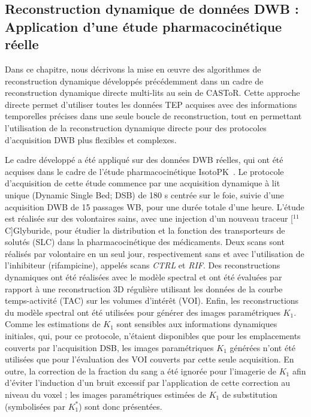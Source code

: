 \subsection*{Reconstruction dynamique de données DWB : Application d'une étude pharmacocinétique réelle}
Dans ce chapitre, nous décrivons la mise en œuvre des algorithmes de reconstruction dynamique développés précédemment dans un cadre de reconstruction dynamique directe multi-lits au sein de CASToR. Cette approche directe permet d'utiliser toutes les données TEP acquises avec des informations temporelles précises dans une seule boucle de reconstruction, tout en permettant l'utilisation de la reconstruction dynamique directe pour des protocoles d'acquisition DWB plus flexibles et complexes.

Le cadre développé a été appliqué sur des données DWB réelles, qui ont été acquises dans le cadre de l'étude pharmacocinétique IsotoPK~\cite{Marie2019}. 
Le protocole d'acquisition de cette étude commence par une acquisition dynamique à lit unique (Dynamic Single Bed; DSB) de 180 s centrée sur le foie, suivie d'une acquisition DWB de 15 passages WB, pour une durée totale d'une heure. L'étude est réalisée sur des volontaires sains, avec une injection d'un nouveau traceur [$^{11}$C]Glyburide, pour étudier la distribution et la fonction des transporteurs de solutés (SLC) dans la pharmacocinétique des médicaments. Deux scans sont réalisés par volontaire en un seul jour, respectivement sans et avec l'utilisation de l'inhibiteur (rifampicine), appelés scans \textit{CTRL} et \textit{RIF}.
Des reconstructions dynamiques ont été réalisées avec le modèle spectral et ont été évaluées par rapport à une reconstruction 3D régulière utilisant les données de la courbe temps-activité (TAC) sur les volumes d'intérêt (VOI). Enfin, les reconstructions du modèle spectral ont été utilisées pour générer des images paramétriques $K_1$. Comme les estimations de $K_1$ sont sensibles aux informations dynamiques initiales, qui, pour ce protocole, n'étaient disponibles que pour les emplacements couverts par l'acquisition DSB, les images paramétriques $K_1$ générées n'ont été utilisées que pour l'évaluation des VOI couverts par cette seule acquisition. En outre, la correction de la fraction du sang a été ignorée pour l'imagerie de $K_1$ afin d'éviter l'induction d'un bruit excessif par l'application de cette correction au niveau du voxel ; les images paramétriques estimées de $K_1$ de substitution (symbolisées par $K_1^{*}$) sont donc présentées.

